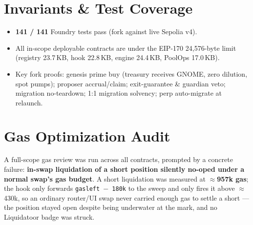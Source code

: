 \documentclass[11pt]{article}
\begin{document}
\section{Invariants \& Test Coverage}

\begin{itemize}[leftmargin=1.4em]
  \item \textbf{141 / 141} Foundry tests pass (fork against live Sepolia v4).
  \item All in-scope deployable contracts are under the EIP-170 24{,}576-byte limit
        (registry 23.7\,KB, hook 22.8\,KB, engine 24.4\,KB, PoolOps 17.0\,KB).
  \item Key fork proofs: genesis prime buy (treasury receives GNOME, zero dilution, spot
        pumps); proposer accrual/claim; exit-guarantee \& guardian veto; migration
        no-teardown; 1:1 migration solvency; perp auto-migrate at relaunch.
\end{itemize}

\section{Gas Optimization Audit}

A full-scope gas review was run across all contracts, prompted by a concrete failure:
\textbf{in-swap liquidation of a short position silently no-oped under a normal
swap's gas budget}. A short liquidation was measured at \textbf{$\approx$957k gas}; the
hook only forwards \texttt{gasleft $-$ 180k} to the sweep and only fires it above
$\approx$430k, so an ordinary router/UI swap never carried enough gas to settle a
short — the position stayed open despite being underwater at the mark, and no
Liquidatoor badge was struck.
\end{document}
